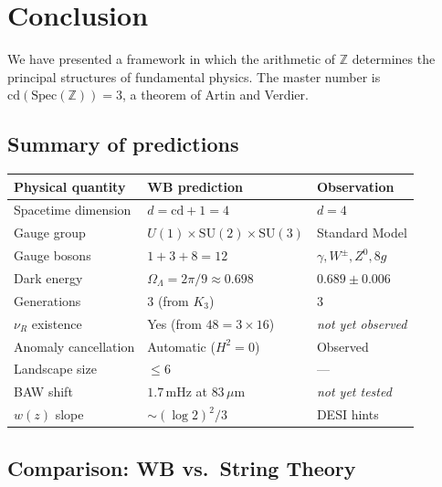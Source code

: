 \documentclass[12pt,a4paper]{article}
\theoremstyle{definition}
\newcommand{\Spec}{\mathrm{Spec}}
\newcommand{\cd}{\mathrm{cd}}
\newcommand{\SU}{\mathrm{SU}}
\newcommand{\Z}{\mathbb{Z}}
\newcommand{\OmL}{\Omega_\Lambda}
\begin{document}
\section{Conclusion}\label{sec:conclusion}

We have presented a framework in which the arithmetic of $\Z$ determines the
principal structures of fundamental physics.  The master number is
$\cd(\Spec(\Z))=3$, a theorem of Artin and Verdier.

\subsection{Summary of predictions}

\begin{center}
\begin{longtable}{p{4cm}p{4cm}p{4cm}}
\toprule
\textbf{Physical quantity} & \textbf{WB prediction} & \textbf{Observation} \\
\midrule
\endhead
Spacetime dimension & $d=\cd+1=4$ & $d=4$ \\
Gauge group & $U(1)\times\SU(2)\times\SU(3)$ & Standard Model \\
Gauge bosons & $1+3+8=12$ & $\gamma,W^\pm,Z^0,8g$ \\
Dark energy & $\OmL=2\pi/9\approx 0.698$ & $0.689\pm 0.006$ \\
Generations & $3$ (from $K_3$) & $3$ \\
$\nu_R$ existence & Yes (from $48=3\times 16$) & \textit{not yet observed} \\
Anomaly cancellation & Automatic ($H^2=0$) & Observed \\
Landscape size & $\le 6$ & --- \\
BAW shift & $1.7\,$mHz at $83\,\mu$m & \textit{not yet tested} \\
$w(z)$ slope & $\sim(\log 2)^2/3$ & DESI hints \\
\bottomrule
\end{longtable}
\end{center}

\subsection{Comparison: WB vs.\ String Theory}
\end{document}
